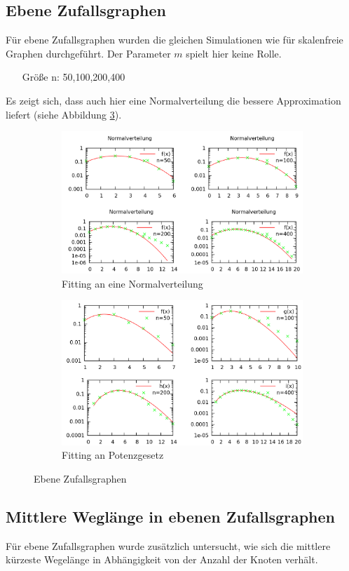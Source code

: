 \documentclass[10pt]{article}
\begin{document}
\subsection{Ebene Zufallsgraphen}
Für ebene Zufallsgraphen wurden die gleichen Simulationen wie für skalenfreie Graphen durchgeführt. Der Parameter $m$ spielt hier keine Rolle.
\begin{itemize}
\item[Größe n:] 50,100,200,400
\end{itemize}
Es zeigt sich, dass auch hier eine Normalverteilung die bessere Approximation liefert (siehe Abbildung \ref{fig:planar}).

\begin{figure}[h!]
\begin{subfigure}{.5\textwidth}
  \centering
  \includegraphics[width=.7\linewidth]{../Results/Normal_Planar_logscale.png}
  \caption{Fitting an eine Normalverteilung}
  \label{fig:sfig1}
\end{subfigure}%
\begin{subfigure}{.5\textwidth}
  \centering
  \includegraphics[width=.7\linewidth]{../Results/Power_Planar_logscale.png}
  \caption{Fitting an Potenzgesetz}
  \label{fig:sfig2}
\end{subfigure}
\caption{Ebene Zufallsgraphen}
\label{fig:planar}
\end{figure}

\subsection{Mittlere Weglänge in ebenen Zufallsgraphen}
Für ebene Zufallsgraphen wurde zusätzlich untersucht, wie sich die mittlere kürzeste Wegelänge in Abhängigkeit von der Anzahl der Knoten verhält. 
\end{document}

